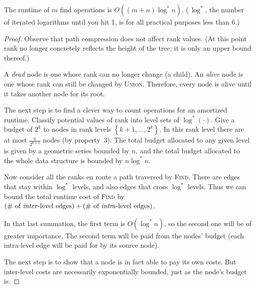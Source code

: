 \begin{theorem}
	The runtime of \(m\) find operations is \(O\left(\left(m + n\right)\log^* n\right)\). (\,\(\log^*\), the number of iterated logarithms until you hit 1, is for all practical purposes less than 6.)
\end{theorem}
\begin{proof}
	Observe that path compression does not affect rank values. (At this point rank no longer concretely reflects the height of the tree; it is only an upper bound thereof.)
	
	A \emph{dead} node is one whose rank can no longer change (a child). 
	An \emph{alive} node is one whose rank can still be changed by \textsc{Union}. Therefore, every node is alive until it takes another node for its root.
	
	The next step is to find a clever way to count operations for an amortized runtime. Classify potential values of rank into level sets of \(\log^*(\cdot)\). Give a budget of \(2^k\) to nodes in rank levels \(\left\{k + 1, \ldots, 2^k\right\}\). In this rank level there are at most \(\frac{n}{2^{k + 1}}\) nodes (by property~3). The total budget allocated to any given level is given by a geometric series bounded by \(n\), and the total budget allocated to the whole data structure is bounded by \(n\log^* n\).
	
	Now consider all the ranks en route a path traversed by \textsc{Find}. There are edges that stay within \(\log^*\) levels, and
	also edges that cross \(\log^*\) levels. Thus we can bound the total runtime cost of \textsc{Find} by \(\left(\text{\# of \emph{inter}-level edges}\right) + \left(\text{\# of \emph{intra}-level edges}\right)\).

	In that last summation, the first term is \(O(\log^* n)\), so the second one will be of greater importance. The second term will be paid from the nodes' budget (each intra-level edge will be paid for by its source node).
	
	The next step is to show that a node is in fact able to pay its own costs. But inter-level costs are necessarily exponentially bounded, just as the node's budget is.
\end{proof}